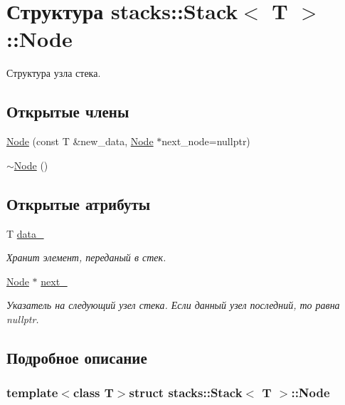 \hypertarget{structstacks_1_1_stack_1_1_node}{}\section{Структура stacks\+:\+:Stack$<$ T $>$\+:\+:Node}
\label{structstacks_1_1_stack_1_1_node}


Структура узла стека.  


\subsection*{Открытые члены}
\begin{DoxyCompactItemize}
\item 
\hyperlink{structstacks_1_1_stack_1_1_node_ab1b011815e334e17824852bea56a6cd9}{Node} (const T \&new\+\_\+data, \hyperlink{structstacks_1_1_stack_1_1_node}{Node} $\ast$next\+\_\+node=nullptr)
\item 
\hyperlink{structstacks_1_1_stack_1_1_node_a04e480b19d2c55a2a551be7acd56d809}{$\sim$\+Node} ()
\end{DoxyCompactItemize}
\subsection*{Открытые атрибуты}
\begin{DoxyCompactItemize}
\item 
T \hyperlink{structstacks_1_1_stack_1_1_node_afbadaa4f786b45d6cd157070caf8ab83}{data\+\_\+}
\begin{DoxyCompactList}\small\item\em Хранит элемент, переданый в стек. \end{DoxyCompactList}\item 
\hyperlink{structstacks_1_1_stack_1_1_node}{Node} $\ast$ \hyperlink{structstacks_1_1_stack_1_1_node_a8274602a782c7533e4f1c7936026913d}{next\+\_\+}
\begin{DoxyCompactList}\small\item\em Указатель на следующий узел стека. Если данный узел последний, то равна nullptr. \end{DoxyCompactList}\end{DoxyCompactItemize}


\subsection{Подробное описание}
\subsubsection*{template$<$class T$>$struct stacks\+::\+Stack$<$ T $>$\+::\+Node}

